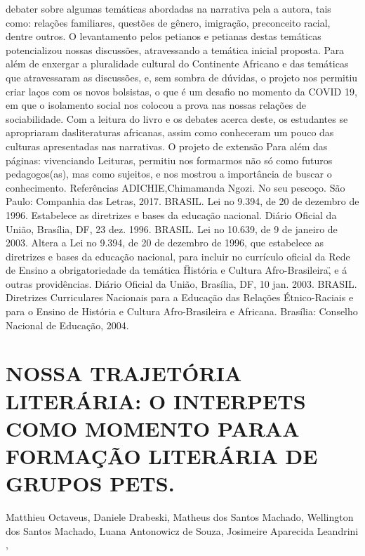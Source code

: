 debater sobre algumas temáticas abordadas na narrativa pela a autora, tais como: relações 
familiares, questões de gênero, imigração, preconceito racial, dentre outros. O levantamento pelos 
petianos e petianas destas temáticas potencializou nossas discussões, atravessando a temática 
inicial proposta. Para além de enxergar a pluralidade cultural do Continente Africano e das 
temáticas que atravessaram as discussões, e, sem sombra de dúvidas, o projeto nos permitiu criar 
laços com os novos bolsistas, o que é um desafio no momento da COVID 19, em que o isolamento 
social nos colocou a prova nas nossas relações de sociabilidade. 
Com a leitura do livro e os debates acerca deste, os estudantes se apropriaram dasliteraturas
africanas, assim como conheceram um pouco das culturas apresentadas nas narrativas. O projeto 
de extensão Para além das páginas: vivenciando Leituras, permitiu nos formarmos não só como 
futuros pedagogos(as), mas como sujeitos, e nos mostrou a importância de buscar o conhecimento. 
Referências
ADICHIE,Chimamanda Ngozi. No seu pescoço. São Paulo: Companhia das Letras, 2017. 
BRASIL. Lei no
9.394, de 20 de dezembro de 1996. Estabelece as diretrizes e bases da educação 
nacional. Diário Oficial da União, Brasília, DF, 23 dez. 1996.
BRASIL. Lei no
10.639, de 9 de janeiro de 2003. Altera a Lei no 9.394, de 20 de dezembro de 
1996, que estabelece as diretrizes e bases da educação nacional, para incluir no currículo oficial 
da Rede de Ensino a obrigatoriedade da temática \"História e Cultura Afro-Brasileira\", e á outras 
providências. Diário Oficial da União, Brasília, DF, 10 jan. 2003.
BRASIL. Diretrizes Curriculares Nacionais para a Educação das Relações Étnico-Raciais e 
para o Ensino de História e Cultura Afro-Brasileira e Africana. Brasília: Conselho Nacional 
de Educação, 2004.



\section{NOSSA TRAJETÓRIA LITERÁRIA: O INTERPETS COMO MOMENTO PARAA FORMAÇÃO LITERÁRIA DE GRUPOS PETS.}

Matthieu Octaveus, Daniele Drabeski, Matheus dos Santos Machado, Wellington dos Santos Machado, Luana Antonowicz de Souza, Josimeire Aparecida Leandrini ,

